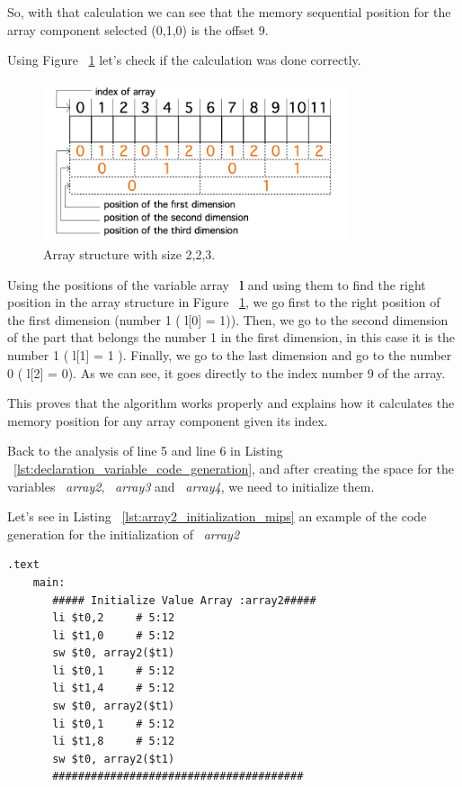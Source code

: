 \documentclass[
  oneside,
  11pt, a4paper,
  footinclude=true,
  headinclude=true,
  cleardoublepage=empty
]{scrbook}
\begin{document}
So, with that calculation we can see that the memory sequential position for the array component selected (0,1,0) is the offset 9.

Using Figure ~\ref{fig:array_example_calculation} let's check if the calculation was done correctly.

\begin{figure}[h!]
 \centering
  \includegraphics[width=0.8\textwidth]{img/array_example_calculation.png}
  \caption{Array structure with size 2,2,3.}
  \label{fig:array_example_calculation}
\end{figure}

Using the positions of the variable array ~\textbf{l} and using them to find the right position in the array structure in Figure ~\ref{fig:array_example_calculation}, we go first to the right position of the first dimension (number 1 ( l[0] = 1)). Then, we go to the second dimension of the part that belongs the number 1 in the first dimension,  in this case it is the number 1 ( l[1] = 1 ). Finally, we go to the last dimension and go to the number 0 ( l[2] = 0).  As we can see, it goes directly to the index number 9 of the array. 

This proves that the algorithm works properly and explains how it calculates the memory position for any array component given its index.

Back to the analysis of line 5 and line 6 in Listing ~\ref{lst:declaration_variable_code_generation}, and after creating the space for the variables ~\textit{array2}, ~\textit{array3} and ~\textit{array4}, we need to initialize them.

Let's see in Listing ~\ref{lst:array2_initialization_mips} an example of the code generation for the initialization of ~\textit{array2}

\begin{lstlisting}[caption={MIPS assembly code generated for the variable array2},label={lst:array2_initialization_mips}]
  .text
    main:
       ##### Initialize Value Array :array2#####
       li $t0,2		# 5:12
       li $t1,0		# 5:12
       sw $t0, array2($t1)		
       li $t0,1		# 5:12
       li $t1,4		# 5:12
       sw $t0, array2($t1)		
       li $t0,1		# 5:12
       li $t1,8		# 5:12
       sw $t0, array2($t1)		
       #######################################
\end{lstlisting}
\end{document}
